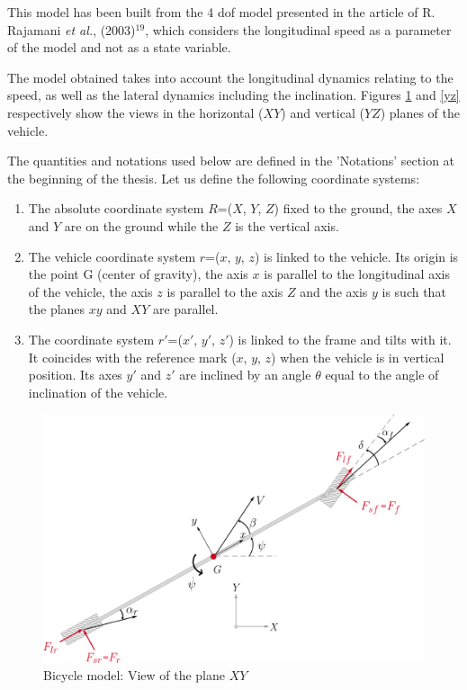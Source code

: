 This model has been built from the 4 dof model presented in the article of R. Rajamani \textit{et al.}, (2003)$^{19}$, which considers the longitudinal speed as a parameter of the model and not as a state variable.

The model obtained takes into account the longitudinal dynamics relating to the speed, as well as the lateral dynamics including the inclination. Figures \ref{xy} and \ref{yz} respectively show the views in the horizontal ($XY$) and vertical ($YZ$) planes of the vehicle. 

The quantities and notations used below are defined in the 'Notations' section at the beginning of the thesis. Let us define the following coordinate systems: 
\begin{enumerate}
\item The absolute coordinate system $R$=($X$, $Y$, $Z$) fixed to the ground, the axes $X$ and $Y$ are on the ground while the $Z$ is the vertical axis. 

\item The vehicle coordinate system $r$=($x$, $y$, $z$) is linked to the vehicle. Its origin is the point G (center of gravity), the axis $x$ is parallel to the longitudinal axis of the vehicle, the axis $z$ is parallel to the axis $Z$ and the axis $y$ is such that the planes $xy$ and $XY$ are parallel.

\item The coordinate system  $r'$=($x'$, $y'$, $z'$) is linked to the frame and tilts with it. It coincides with the reference mark ($x$, $y$, $z$) when the vehicle is in vertical position. Its axes $y'$ and $z'$ are inclined by an angle $\theta$ equal to the angle of inclination of the vehicle. 

\end{enumerate}

\newpage
\begin{figure}[h!]
	\includegraphics[width=1.0\linewidth]{figs/02/xy1}
	\caption{Bicycle model: View of the plane $XY$}
	\label{xy}
\end{figure}

